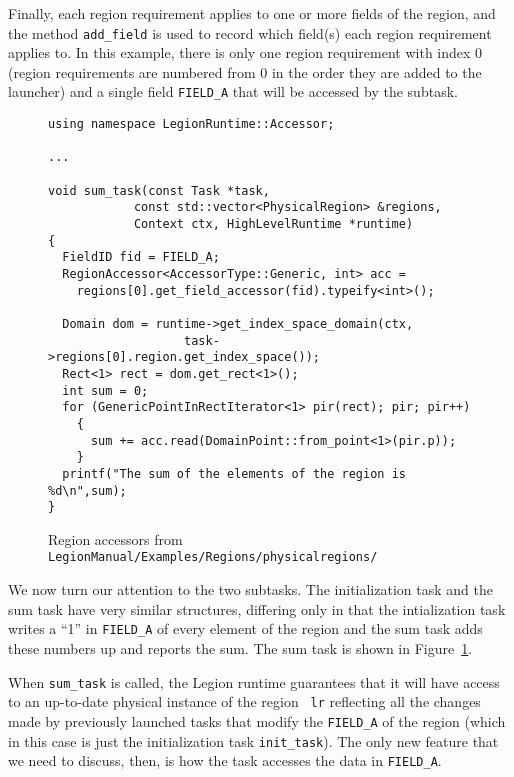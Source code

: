 \documentclass[11pt]{book}
\newcommand{\legionbook}[1]{{\tt LegionManual/Examples/#1}}
\begin{document}
Finally, each region requirement applies to one or more fields of the region, and the method {\tt add\_field} is
used to record which field(s) each region requirement applies to.
In this example, there is only one region requirement with index 0 (region requirements
are numbered from 0 in the order they are added to the launcher) and a single field {\tt FIELD\_A} that will be
accessed by the subtask.

\begin{figure}
{\small
\begin{lstlisting}
using namespace LegionRuntime::Accessor;

...

void sum_task(const Task *task,
		    const std::vector<PhysicalRegion> &regions,
		    Context ctx, HighLevelRuntime *runtime)
{
  FieldID fid = FIELD_A;
  RegionAccessor<AccessorType::Generic, int> acc =
    regions[0].get_field_accessor(fid).typeify<int>();

  Domain dom = runtime->get_index_space_domain(ctx,
                   task->regions[0].region.get_index_space());
  Rect<1> rect = dom.get_rect<1>();
  int sum = 0;
  for (GenericPointInRectIterator<1> pir(rect); pir; pir++)
    {
      sum += acc.read(DomainPoint::from_point<1>(pir.p));
    }
  printf("The sum of the elements of the region is %d\n",sum);
}
\end{lstlisting}
}
\caption{Region accessors from \legionbook{Regions/physicalregions/}}
\label{fig:accessors}
\end{figure}
We now turn our attention to the two subtasks.  The initialization task and the sum task have very similar
structures, differing only in that the intialization task writes a ``1'' in {\tt FIELD\_A} of every element of the region and
the sum task adds these numbers up and reports the sum.  The sum task is shown in Figure~\ref{fig:accessors}.

When {\tt sum\_task} is called, the Legion runtime guarantees that it
will have access to an up-to-date physical instance of the region {\tt
  lr} reflecting all the changes made by previously launched tasks
that modify the {\tt FIELD\_A} of the region (which in this case is
just the initialization task {\tt init\_task}).  The only new feature
that we need to discuss, then, is how the task accesses the data in {\tt FIELD\_A}.
\end{document}
